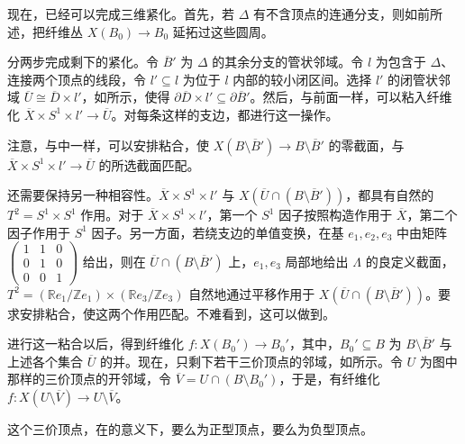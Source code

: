 现在，已经可以完成三维紧化。首先，若 $\Delta$ 有不含顶点的连通分支，则如前所述，把纤维丛 $X(B_0)\to B_0$ 延拓过这些圆周。

分两步完成剩下的紧化。令 $\overline B'$ 为 $\Delta$ 的其余分支的管状邻域。令 $l$ 为包含于 $\Delta$、连接两个顶点的线段，令 $l'\subseteq l$ 为位于 $l$ 内部的较小闭区间。选择 $l'$ 的闭管状邻域 $\overline U\cong\overline D\times l'$，如所示，使得 $\partial\overline D\times l'\subseteq\partial\overline B'$。然后，与前面一样，可以粘入纤维化 $\overline X\times S^1\times l'\to\overline U$。对每条这样的支边，都进行这一操作。
\begin{figure}[H]
\centering
{}
\BookNumberOnlyCaption\label{fig:6.12}
\end{figure}

注意，与中一样，可以安排粘合，使 $X(B\setminus\overline B')\to B\setminus\overline B'$ 的零截面，与 $\overline X\times S^1\times l'\to\overline U$ 的所选截面匹配。

还需要保持另一种相容性。$\overline X\times S^1\times l'$ 与 $X(\overline U\cap(B\setminus\overline B'))$，都具有自然的 $T^2=S^1\times S^1$ 作用。对于 $\overline X\times S^1\times l'$，第一个 $S^1$ 因子按照构造作用于 $\overline X$，第二个因子作用于 $S^1$ 因子。另一方面，若绕支边的单值变换，在基 $e_1,e_2,e_3$ 中由矩阵 $\begin{pmatrix}1&1&0\\0&1&0\\0&0&1\end{pmatrix}$ 给出，则在 $\overline U\cap(B\setminus\overline B')$ 上，$e_1,e_3$ 局部地给出 $\Lambda$ 的良定义截面，$T^2=(\mathbb Re_1/\mathbb Ze_1)\times(\mathbb Re_3/\mathbb Ze_3)$ 自然地通过平移作用于 $X(\overline U\cap(B\setminus\overline B'))$。要求安排粘合，使这两个作用匹配。不难看到，这可以做到。

进行这一粘合以后，得到纤维化 $f\colon X(B_0')\to B_0'$，其中，$B_0'\subseteq B$ 为 $B\setminus\overline B'$ 与上述各个集合 $\overline U$ 的并。现在，只剩下若干三价顶点的邻域，如所示。令 $U$ 为图中那样的三价顶点的开邻域，令 $\overline V=U\cap(B\setminus B_0')$，于是，有纤维化 $f\colon X(U\setminus\overline V)\to U\setminus\overline V$。
\begin{figure}[H]
\centering
{}
\BookNumberOnlyCaption\label{fig:6.13}
\end{figure}
这个三价顶点，在的意义下，要么为正型顶点，要么为负型顶点。

